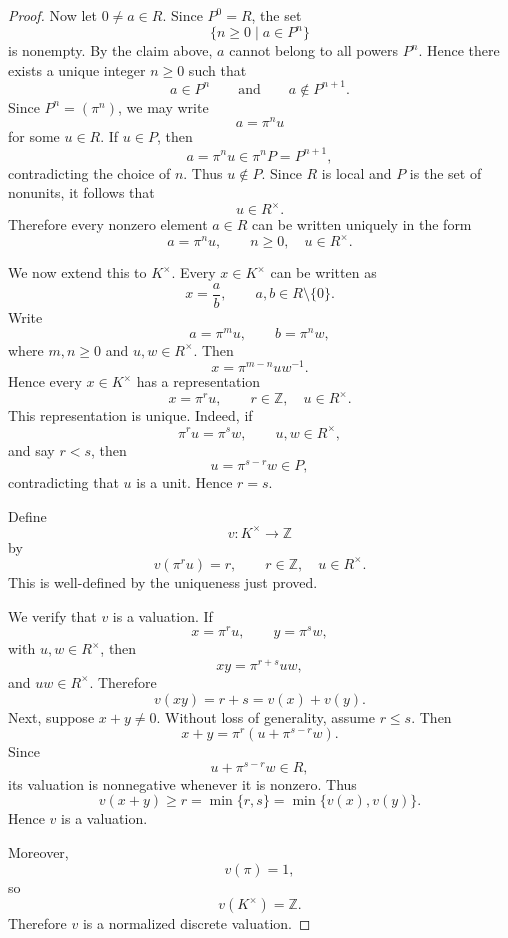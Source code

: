 \begin{proof}
    Now let \(0\neq a\in R\). Since \(P^0=R\), the set
    \[
        \{n\geq 0\mid a\in P^n\}
    \]
    is nonempty. By the claim above, \(a\) cannot belong to all powers \(P^n\). Hence
    there exists a unique integer \(n\geq 0\) such that
    \[
        a\in P^n
        \qquad\text{and}\qquad
        a\notin P^{n+1}.
    \]
    Since \(P^n=(\pi^n)\), we may write
    \[
        a=\pi^n u
    \]
    for some \(u\in R\). If \(u\in P\), then
    \[
        a=\pi^n u\in \pi^n P=P^{n+1},
    \]
    contradicting the choice of \(n\). Thus \(u\notin P\). Since \(R\) is local and \(P\)
    is the set of nonunits, it follows that
    \[
        u\in R^\times.
    \]
    Therefore every nonzero element \(a\in R\) can be written uniquely in the form
    \[
        a=\pi^n u,
        \qquad n\geq 0,\quad u\in R^\times.
    \]

    We now extend this to \(K^\times\). Every \(x\in K^\times\) can be written as
    \[
        x=\frac{a}{b},
        \qquad a,b\in R\setminus\{0\}.
    \]
    Write
    \[
        a=\pi^m u,\qquad b=\pi^n w,
    \]
    where \(m,n\geq 0\) and \(u,w\in R^\times\). Then
    \[
        x=\pi^{m-n}uw^{-1}.
    \]
    Hence every \(x\in K^\times\) has a representation
    \[
        x=\pi^r u,
        \qquad r\in \mathbb{Z},\quad u\in R^\times.
    \]
    This representation is unique. Indeed, if
    \[
        \pi^r u=\pi^s w,
        \qquad u,w\in R^\times,
    \]
    and say \(r<s\), then
    \[
        u=\pi^{s-r}w\in P,
    \]
    contradicting that \(u\) is a unit. Hence \(r=s\).

    Define
    \[
        v:K^\times\longrightarrow \mathbb{Z}
    \]
    by
    \[
        v(\pi^r u)=r,
        \qquad r\in\mathbb{Z},\quad u\in R^\times.
    \]
    This is well-defined by the uniqueness just proved.

    We verify that \(v\) is a valuation. If
    \[
        x=\pi^r u,\qquad y=\pi^s w,
    \]
    with \(u,w\in R^\times\), then
    \[
        xy=\pi^{r+s}uw,
    \]
    and \(uw\in R^\times\). Therefore
    \[
        v(xy)=r+s=v(x)+v(y).
    \]
    Next, suppose \(x+y\neq 0\). Without loss of generality, assume \(r\leq s\). Then
    \[
        x+y=\pi^r\left(u+\pi^{s-r}w\right).
    \]
    Since
    \[
        u+\pi^{s-r}w\in R,
    \]
    its valuation is nonnegative whenever it is nonzero. Thus
    \[
        v(x+y)\geq r=\min\{r,s\}=\min\{v(x),v(y)\}.
    \]
    Hence \(v\) is a valuation.

    Moreover,
    \[
        v(\pi)=1,
    \]
    so
    \[
        v(K^\times)=\mathbb{Z}.
    \]
    Therefore \(v\) is a normalized discrete valuation.


\end{proof}
